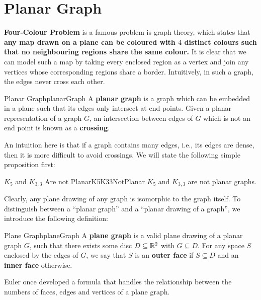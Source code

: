 \documentclass[math, code]{amznotes}
\theoremstyle{remark}
\begin{document}
\section{Planar Graph}
\textbf{Four-Colour Problem} is a famous problem is graph theory, which states that \textbf{any map drawn on a plane can be coloured with $4$ distinct colours such that no neighbouring regions share the same colour.} It is clear that we can model such a map by taking every enclosed region as a vertex and join any vertices whose corresponding regions share a border. Intuitively, in such a graph, the edges never cross each other.
\begin{dfnbox}{Planar Graph}{planarGraph}
    A {\color{red} \textbf{planar graph}} is a graph which can be embedded in a plane such that its edges only intersect at end points. Given a planar representation of a graph $G$, an intersection between edges of $G$ which is not an end point is known as a {\color{red} \textbf{crossing}}.
\end{dfnbox}
An intuition here is that if a graph contains many edges, i.e., its edges are dense, then it is more difficult to avoid crossings. We will state the following simple proposition first:
\begin{probox}{$K_5$ and $K_{3, 3}$ Are not Planar}{K5K33NotPlanar}
    $K_5$ and $K_{3, 3}$ are not planar graphs.
\end{probox}
Clearly, any plane drawing of any graph is isomorphic to the graph itself. To distinguish between a ``planar graph'' and a ``planar drawing of a graph'', we introduce the following definition:
\begin{dfnbox}{Plane Graph}{planeGraph}
    A {\color{red} \textbf{plane graph}} is a valid plane drawing of a planar graph $G$, such that there exists some disc $D \subseteq \mathbb{R}^2$ with $G \subseteq D$. For any space $S$ enclosed by the edges of $G$, we say that $S$ is an {\color{red} \textbf{outer face}} if $S \subseteq D$ and an {\color{red} \textbf{inner face}} otherwise.
\end{dfnbox}
Euler once developed a formula that handles the relationship between the numbers of faces, edges and vertices of a plane graph.
\end{document}
